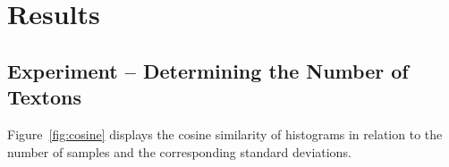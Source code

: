 \chapter{Results}
\label{chap:results}

\section{Experiment -- Determining the Number of Textons}

Figure~\ref{fig:cosine} displays the cosine similarity of histograms
in relation to the number of samples and the corresponding standard
deviations.
